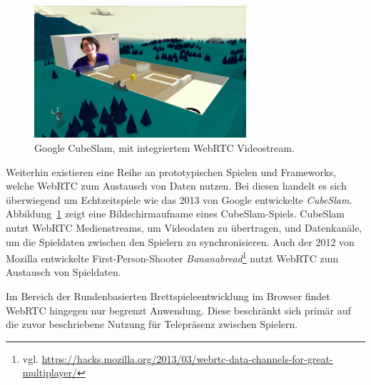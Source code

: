 \begin{figure}[h]
\centering
\includegraphics[width=0.70\textwidth]{bilder/cubeslam.jpg}
\caption{Google CubeSlam, mit integriertem WebRTC Videostream.}
\label{fig:cuubslam}
\end{figure}

Weiterhin existieren eine Reihe an prototypischen Spielen und Frameworks, welche \acs{WebRTC} zum Austausch von Daten nutzen. Bei diesen handelt es sich überwiegend um Echtzeitspiele wie das 2013 von Google entwickelte \textit{CubeSlam}. Abbildung~\ref{fig:cuubslam} zeigt eine Bildschirmaufname eines CubeSlam-Spiels. CubeSlam nutzt \acs{WebRTC} Medienstreams, um Videodaten zu übertragen, und Datenkanäle, um die Spieldaten zwischen den Spielern zu synchronisieren. Auch der 2012 von Mozilla entwickelte First-Person-Shooter \textit{Bananabread}\footnote{vgl. \url{https://hacks.mozilla.org/2013/03/webrtc-data-channels-for-great-multiplayer/}} nutzt WebRTC zum Austausch von Spieldaten.\par

Im Bereich der Rundenbasierten Brettspieleentwicklung im Browser findet WebRTC hingegen nur begrenzt Anwendung. Diese beschränkt sich primär auf die zuvor beschriebene Nutzung für Telepräsenz zwischen Spielern.\par
